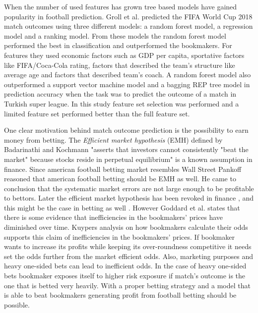 When the number of used features has grown tree based models have gained popularity in football prediction. Groll et al. \cite{groll2018prediction} predicted the FIFA World Cup 2018 match outcomes using three different models: a random forest model, a regression model and a ranking model. From these models the random forest model performed the best in classification and outperformed the bookmakers. For features they used economic factors such as GDP per capita, sportative factors like FIFA/Coca-Cola rating, factors that described the team's structure like average age and factors that described team's coach. A random forest model also outperformed a support vector machine model and a bagging REP tree model in prediction accuracy when the task was to predict the outcome of a match in Turkish super league. In this study feature set selection was performed and a limited feature set performed better than the full feature set. \cite{10.1007/978-3-319-29504-6_48}

One clear motivation behind match outcome prediction is the possibility to earn money from betting. The \textit{Efficient market hypothesis} (EMH) defined by Badarinathi and Kochmann \cite{badarinathi1996football} "asserts that investors cannot consistently "beat the market" because stocks reside in perpetual equilibrium" is a known assumption in finance. Since american football betting market resembles Wall Street Pankoff \cite{pankoff1968market} reasoned that american football betting should be EMH as well. He came to conclusion that the systematic market errors are not large enough to be profitable to bettors. Later the efficient market hypothesis has been revoked in finance \cite{jegadeesh1993returns}, and this might be the case in betting as well \cite{goddard2003modelling, badarinathi1996football}. However Goddard et al. \cite{goddard2003modelling} states that there is some evidence that inefficiencies in the bookmakers’ prices have diminished over time. Kuypers \cite{kuypers2008} analysis on how bookmakers calculate their odds supports this claim of inefficiencies in the bookmakers’ prices. If bookmaker wants to increase its profits while keeping its over-roundness competitive it needs set the odds further from the market efficient odds. Also, marketing purposes and heavy one-sided bets can lead to inefficient odds. In the case of heavy one-sided bets bookmaker exposes itself to higher risk exposure if match's outcome is the one that is betted very heavily. With a proper betting strategy and a model that is able to beat bookmakers generating profit from football betting should be possible.

